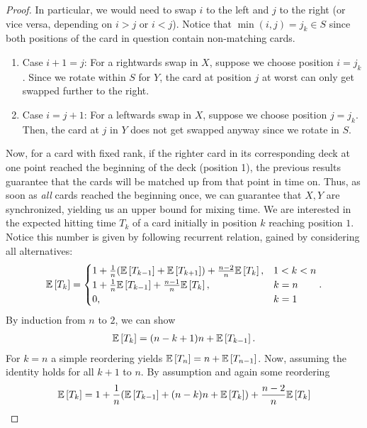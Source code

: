 \begin{aufgabe}
\begin{proof}
    In particular, we would need to swap $i$ to the left and $j$ to the right (or vice versa, depending on $i>j$ or $i<j$).
    Notice that $\min(i,j) = j_k \in S$ since both positions of the card in question contain non-matching cards.
    \begin{enumerate}
        \item Case $i+1 = j$: For a rightwards swap in $X$, suppose we choose position $i = j_k$. 
        Since we rotate within $S$ for $Y$, the card at position $j$ at worst can only get swapped further to the right.
        \item Case $i = j+1$: For a leftwards swap in $X$, suppose we choose position $j = j_k$.
        Then, the card at $j$ in $Y$ does not get swapped anyway since we rotate in $S$.
    \end{enumerate}
    Now, for a card with fixed rank, if the righter card in its corresponding deck at one point reached the beginning of the deck (position 1), the previous results guarantee that the cards will be matched up from that point in time on.
    Thus, as soon as \emph{all} cards reached the beginning once, we can guarantee that $X,Y$ are synchronized, yielding us an upper bound for mixing time.
    We are interested in the expected hitting time $T_k$ of a card initially in position $k$ reaching position $1$.
    Notice this number is given by following recurrent relation, gained by considering all alternatives:
    \begin{align*}
        \mathbb{E}\left[T_k\right] = \begin{cases}
        1 + \frac{1}{n}(\mathbb{E}\left[T_{k-1}\right] + \mathbb{E}\left[T_{k+1}\right]) + \frac{n-2}{n}\mathbb{E}\left[T_k\right], & 1<k<n\\
        1 + \frac{1}{n}\mathbb{E}\left[T_{k-1}\right] + \frac{n-1}{n}\mathbb{E}\left[T_k\right], & k=n\\
        0, & k=1
        \end{cases}.
    \end{align*}
    By induction from $n$ to $2$, we can show 
    \begin{align*}
        \mathbb{E}\left[T_k\right] = (n-k+1)n + \mathbb{E}\left[T_{k-1}\right].
    \end{align*}
    For $k=n$ a simple reordering yields $\mathbb{E}\left[T_n\right] = n + \mathbb{E}\left[T_{n-1}\right]$.
    Now, assuming the identity holds for all $k+1$ to $n$.
    By assumption and again some reordering
    \begin{align*}
        &\expect{T_k} = 1 + \frac{1}{n}(\expect{T_{k-1}} + (n-k)n + \expect{T_{k}} ) + \frac{n-2}{n}\expect{T_k} \\

\end{align*}
\end{proof}
\end{aufgabe}
